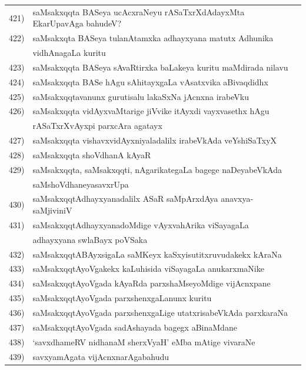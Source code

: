 \begin{longtable}{@{}cp{7.4cm}r}
421) & saMsakxqqta BASeya ucAcxraNeyu rASaTxrXdAdayxMta EkarUpavAga bahudeV? & \pageref{page33a}\\
422) & saMsakxqta BASeya tulanAtamxka adhayxyana matutx Adhunika & \\
     & vidhAnagaLa kuritu & \pageref{page52}\\
423)  & saMsakxqqta BASeya sAvaRtirxka baLakeya kuritu maMdirada nilavu & \pageref{page33g}\\
424) & saMsakxqqta BASe hAgu sAhitayxgaLa vAsatxvika aBivaqdidhx & \pageref{page31a}\\
425) & saMsakxqqtavanunx gurutisalu lakaSxNa jAcnxna irabeVku & \pageref{page1b}\\ 
426) & saMsakxqqta vidAyxvaMtarige jiVvike itAyxdi vayxvasethx hAgu & \\
     & rASaTxrXvAyxpi parxcAra agatayx & \pageref{page46}\\
427) & saMsakxqqta vishavxvidAyxniyaladalilx irabeVkAda veYshiSaTxyX & \pageref{page37b}\\
428) &  saMsakxqqta shoVdhanA kAyaR & \pageref{page53b}\\
429) & saMsakxqqta, saMsakxqqti, nAgarikategaLa bagege naDeyabeVkAda & \\
     & saMshoVdhaneyasavxrUpa & \pageref{page53c}\\
430) & saMsakxqqtAdhayxyanadalilx ASaR saMpArxdAya anavxya-saMjiviniV & \pageref{page45a} \\
431) & saMsakxqqtAdhayxyanadoMdige vAyxvahArika viSayagaLa  & \\
     & adhayxyana swlaBayx poVSaka & \pageref{page47}\\
432) & saMsakxqqtABAyxsigaLa saMKeyx kaSxyisutitxruvudakekx kAraNa & \pageref{page45}\\
433) & saMsakxqqtAyoVgakekx kaLuhisida viSayagaLa anukarxmaNike & \pageref{20d}\\
434) & saMsakxqqtAyoVgada kAyaRda parxshaMseyoMdige vijAcnxpane & \pageref{page21}\\
435) & saMsakxqqtAyoVgada parxshenxgaLanunx kuritu & \pageref{page29b}\\ 
436) & saMsakxqqtAyoVgada parxshenxgaLige utatxrisabeVkAda parxkaraNa & \pageref{page19}\\
437) & saMsakxqqtAyoVgada sadAshayada bagegx aBinaMdane & \pageref{page29}\\
438) & `savxdhameRV nidhanaM sherxVyaH' eMba mAtige vivaraNe & \pageref{page197}\\
439) & savxyamAgata vijAcnxnarAgabahudu & \pageref{page107a}\\

\end{longtable}
